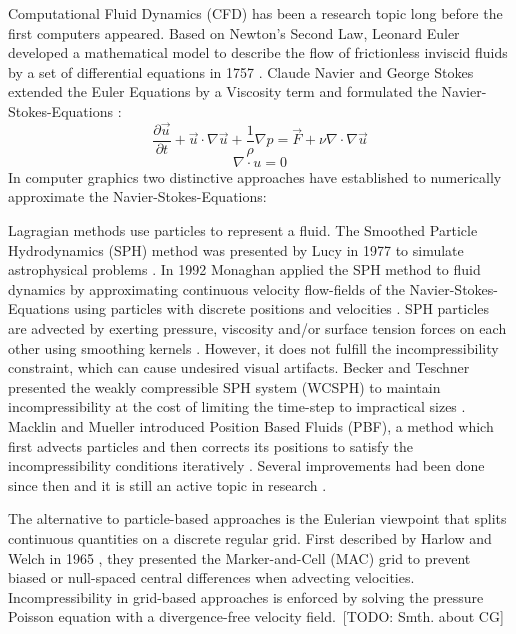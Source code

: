 Computational Fluid Dynamics (CFD) has been a research topic long before the first computers appeared. Based on Newton's Second Law, Leonard Euler developed a mathematical model to describe the flow of frictionless inviscid fluids by a set of differential equations in 1757 \parencite{euler1757principes}. Claude Navier and George Stokes extended the Euler Equations by a Viscosity term and formulated the Navier-Stokes-Equations \parencite{navier1827memoire} \parencite{stokes1880theories}:
\[
    \frac{\partial \vec{u}}{\partial t} + \vec{u} \cdot \nabla \vec{u} + \frac{1}{\rho}  \nabla p = \vec{F} + \nu \nabla \cdot \nabla \vec{u}
\]
\[
    \nabla \cdot u = 0
\]
In computer graphics two distinctive approaches have established to numerically approximate the Navier-Stokes-Equations: 
\par Lagragian methods use particles to represent a fluid. The Smoothed Particle Hydrodynamics (SPH) method was presented by Lucy in 1977 to simulate astrophysical problems \parencite{lucy1977numerical}. In 1992 Monaghan applied the SPH method to fluid dynamics by approximating continuous velocity flow-fields of the Navier-Stokes-Equations using particles with discrete positions and velocities \parencite{monaghan1992smoothed}. SPH particles are advected by exerting pressure, viscosity and/or surface tension forces on each other using smoothing kernels \parencite{muller2003particle}. However, it does not fulfill the incompressibility constraint, which can cause undesired visual artifacts. Becker and Teschner presented the weakly compressible SPH system (WCSPH) to maintain incompressibility at the cost of limiting the time-step to impractical sizes \parencite{becker2007weakly}. Macklin and Mueller introduced Position Based Fluids (PBF), a method which first advects particles and then corrects its positions to satisfy the incompressibility conditions iteratively \parencite{macklin2013position}. Several improvements had been done since then and it is still an active topic in research \parencite{morikawaimprovements}.
\par The alternative to particle-based approaches is the Eulerian viewpoint that splits continuous quantities on a discrete regular grid. First described by Harlow and Welch in 1965 \parencite{harlow1965numerical}, they presented the Marker-and-Cell (MAC) grid to prevent biased or null-spaced central differences when advecting velocities. Incompressibility in grid-based approaches is enforced by solving the pressure Poisson equation with a divergence-free velocity field. [TODO: Smth. about CG]
